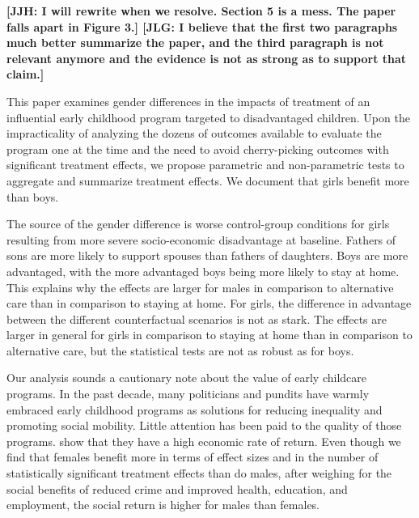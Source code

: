 \textbf{[JJH: I will rewrite when we resolve. Section 5 is a mess. The paper falls apart in Figure 3.] [JLG: I believe that the first two paragraphs much better summarize the paper, and the third paragraph is not relevant anymore and the evidence is not as strong as to support that claim.]}

This paper examines gender differences in the impacts of treatment of an influential early childhood program targeted to disadvantaged children. Upon the impracticality of analyzing the dozens of outcomes available to evaluate the program one at the time and the need to avoid cherry-picking outcomes with significant treatment effects, we propose parametric and non-parametric tests to aggregate and summarize treatment effects. We document that girls benefit more than boys. 

The source of the gender difference is worse control-group conditions for girls resulting from more severe socio-economic disadvantage at baseline. Fathers of sons are more likely to support spouses than fathers of daughters. Boys are more advantaged, with the more advantaged boys being more likely to stay at home. This explains why the effects are larger for males in comparison to alternative care than in comparison to staying at home. For girls, the difference in advantage between the different counterfactual scenarios is not as stark. The effects are larger in general for girls in comparison to staying at home than in comparison to alternative care, but the statistical tests are not as robust as for boys.

Our analysis sounds a cautionary note about the value of early childcare programs. In the past decade, many politicians and pundits have warmly embraced early childhood programs as solutions for reducing inequality and promoting social mobility. Little attention has been paid to the quality of those programs. \cite{Garcia_Heckman_Leaf_etal_2017_Comp_CBA_Unpublished} show that they have a high economic rate of return. Even though we find that females benefit more in terms of effect sizes and in the number of statistically significant treatment effects than do males, after weighing for the social benefits of reduced crime and improved health, education, and employment, the social return is higher for males than females.